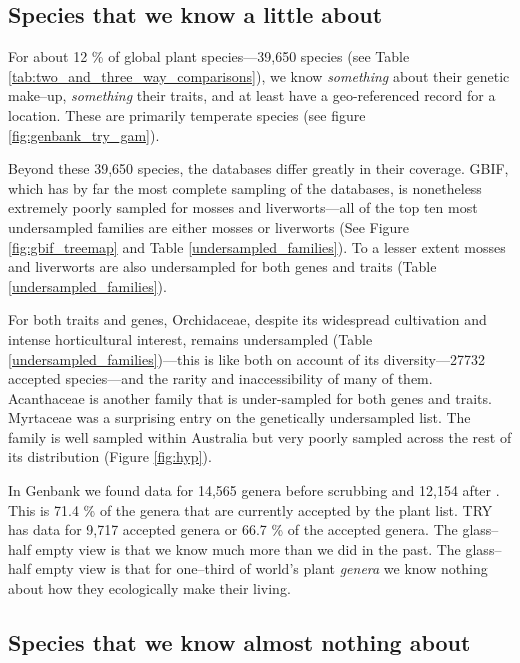 \documentclass[a4paper,11pt]{article}
\begin{document}
\subsection{Species that we know a little about}

For about 12 \% of global plant species---39,650 species (see Table \ref{tab:two_and_three_way_comparisons}), we know \emph{something} about their genetic make--up, \emph{something} their traits, and at least have a geo-referenced record for a location.  These are primarily temperate species (see figure \ref{fig:genbank_try_gam}).

Beyond these 39,650 species, the databases differ greatly in their coverage.  GBIF, which has by far the most complete sampling of the databases, is nonetheless extremely poorly sampled for mosses and liverworts---all of the top ten most undersampled families are either mosses or liverworts (See Figure \ref{fig:gbif_treemap} and Table \ref{undersampled_families}).  To a lesser extent mosses and liverworts are also undersampled for both genes and traits (Table \ref{undersampled_families}).  

For both traits and genes, Orchidaceae, despite its widespread cultivation and intense horticultural interest, remains undersampled (Table \ref{undersampled_families})---this is like both on account of its diversity---27732 accepted species---and the rarity and inaccessibility of many of them.  Acanthaceae is another family that is under-sampled for both genes and traits.  Myrtaceae was a surprising entry on the genetically undersampled list.  The family is well sampled within Australia but very poorly sampled across the rest of its distribution (Figure \ref{fig:hyp}).  

In Genbank we found data for 14,565 genera before scrubbing and 12,154 after \citep[see][for a detailed analysis of number of genes and phylogenetic distribution of the data]{hinchliff2014some}.  This is 71.4 \% of the genera that are currently accepted by the plant list.  TRY has data for 9,717 accepted genera or 66.7 \% of the accepted genera.  The glass--half empty view is that we know much more than we did in the past.  The glass--half empty view is that for one--third of world's plant \emph{genera} we know nothing about how they ecologically make their living.  

\subsection{Species that we know almost nothing about}
\end{document}
